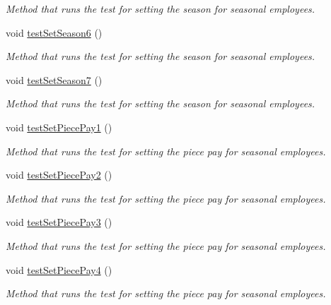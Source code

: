 \begin{DoxyCompactItemize}
\begin{DoxyCompactList}\small\item\em Method that runs the test for setting the season for seasonal employees. \end{DoxyCompactList}\item 
void \hyperlink{class_all_employees_test_1_1_all_employees_tests_a1735ae6f83fbab249165e159fee3e601}{test\+Set\+Season6} ()
\begin{DoxyCompactList}\small\item\em Method that runs the test for setting the season for seasonal employees. \end{DoxyCompactList}\item 
void \hyperlink{class_all_employees_test_1_1_all_employees_tests_ae7fbb7212e008fafe188bcdbc3e609fb}{test\+Set\+Season7} ()
\begin{DoxyCompactList}\small\item\em Method that runs the test for setting the season for seasonal employees. \end{DoxyCompactList}\item 
void \hyperlink{class_all_employees_test_1_1_all_employees_tests_accad46362fa07f9076beb01a1b3887a6}{test\+Set\+Piece\+Pay1} ()
\begin{DoxyCompactList}\small\item\em Method that runs the test for setting the piece pay for seasonal employees. \end{DoxyCompactList}\item 
void \hyperlink{class_all_employees_test_1_1_all_employees_tests_a53d4442c9d8b2c08e2927121c31ed004}{test\+Set\+Piece\+Pay2} ()
\begin{DoxyCompactList}\small\item\em Method that runs the test for setting the piece pay for seasonal employees. \end{DoxyCompactList}\item 
void \hyperlink{class_all_employees_test_1_1_all_employees_tests_a51315fa0add805bc7b94634b81924815}{test\+Set\+Piece\+Pay3} ()
\begin{DoxyCompactList}\small\item\em Method that runs the test for setting the piece pay for seasonal employees. \end{DoxyCompactList}\item 
void \hyperlink{class_all_employees_test_1_1_all_employees_tests_aa08ba16fe984709011d2bd40983fe11b}{test\+Set\+Piece\+Pay4} ()
\begin{DoxyCompactList}\small\item\em Method that runs the test for setting the piece pay for seasonal employees. \end{DoxyCompactList}\end{DoxyCompactItemize}


